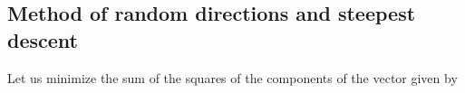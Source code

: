 \subsection{Method of random directions and steepest descent}
 
\par
Let us minimize the sum of the squares of the components
of the  vector given by
%
%

